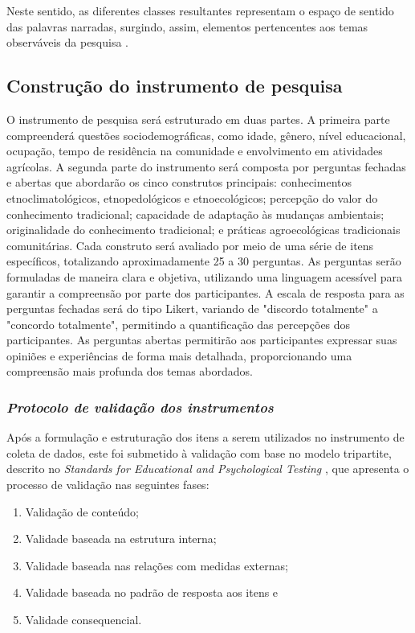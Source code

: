 Neste sentido, as diferentes classes resultantes representam o espaço de sentido das palavras narradas, surgindo, assim, elementos pertencentes aos temas observáveis da pesquisa \cite{Gavasso2016}.


\subsection{Construção do instrumento de pesquisa}

O instrumento de pesquisa será estruturado em duas partes. A primeira parte compreenderá questões sociodemográficas, como idade, gênero, nível educacional, ocupação, tempo de residência na comunidade e envolvimento em atividades agrícolas. A segunda parte do instrumento será composta por perguntas fechadas e abertas que abordarão os cinco construtos principais: conhecimentos etnoclimatológicos, etnopedológicos e etnoecológicos; percepção do valor do conhecimento tradicional; capacidade de adaptação às mudanças ambientais; originalidade do conhecimento tradicional; e práticas agroecológicas tradicionais comunitárias. Cada construto será avaliado por meio de uma série de itens específicos, totalizando aproximadamente 25 a 30 perguntas. As perguntas serão formuladas de maneira clara e objetiva, utilizando uma linguagem acessível para garantir a compreensão por parte dos participantes. A escala de resposta para as perguntas fechadas será do tipo Likert, variando de "discordo totalmente" a "concordo totalmente", permitindo a quantificação das percepções dos participantes. As perguntas abertas permitirão aos participantes expressar suas opiniões e experiências de forma mais detalhada, proporcionando uma compreensão mais profunda dos temas abordados.

\subsubsection*{\textit{Protocolo de validação dos instrumentos}}

Após a formulação e estruturação dos itens a serem utilizados no instrumento de coleta de dados, este foi submetido à validação com base no modelo tripartite, descrito no \textit{Standards for Educational and Psychological Testing} \cite{Association2018}, que apresenta o processo de validação nas seguintes fases: 

\begin{enumerate}
\item Validação de conteúdo; 
\item Validade baseada na estrutura interna; 
\item Validade baseada nas relações com medidas externas; 
\item Validade baseada no padrão de resposta aos itens e
\item Validade consequencial.
\end{enumerate}

